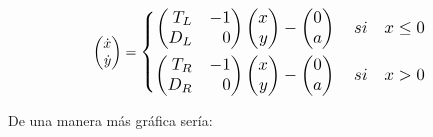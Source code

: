 \documentclass[12pt,a4paper]{report} %
\begin{document}
	\begin{equation}
		\begin{pmatrix*}[r]
			\dot{x} \\ \dot{y}
		\end{pmatrix*}=
		\label{eq:lienardrl}
		\scalebox{1.2}{$\displaystyle
			\left\{
			\begin{aligned}
				\begin{pmatrix*}[r]
					T_L & -1\\
					D_L & 0
				\end{pmatrix*}\begin{pmatrix*}[r]
					x \\ y
				\end{pmatrix*}-\begin{pmatrix}
					0\\a
				\end{pmatrix} \quad si \quad x\leq 0 \\
				\begin{pmatrix*}[r]
					T_R & -1\\
					D_R & 0
				\end{pmatrix*}\begin{pmatrix*}[r]
					x \\ y
				\end{pmatrix*}-\begin{pmatrix}
					0\\a
				\end{pmatrix} \quad si \quad x > 0
			\end{aligned}
			\right. 
			$}
	\end{equation}\smallskip
	
	De una manera más gráfica sería:
	
\end{document}
